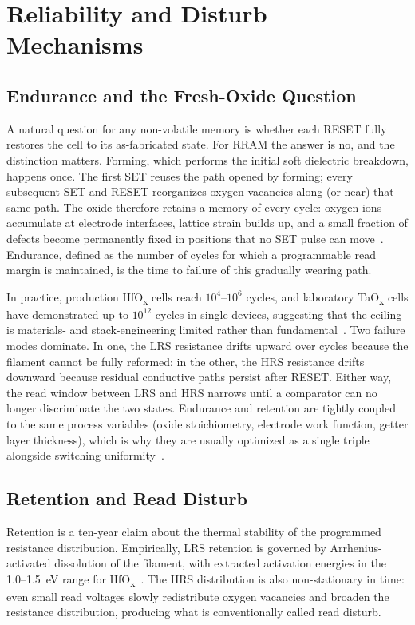 \documentclass[lettersize,journal]{IEEEtran}
\begin{document}
\section{Reliability and Disturb Mechanisms}\label{sec:rel}

\subsection{Endurance and the Fresh-Oxide Question}
A natural question for any non-volatile memory is whether each RESET fully restores the cell to its as-fabricated state. For RRAM the answer is no, and the distinction matters. Forming, which performs the initial soft dielectric breakdown, happens once. The first SET reuses the path opened by forming; every subsequent SET and RESET reorganizes oxygen vacancies along (or near) that same path. The oxide therefore retains a memory of every cycle: oxygen ions accumulate at electrode interfaces, lattice strain builds up, and a small fraction of defects become permanently fixed in positions that no SET pulse can move~\cite{ref_ielmini2016}. Endurance, defined as the number of cycles for which a programmable read margin is maintained, is the time to failure of this gradually wearing path.

In practice, production HfO\textsubscript{x} cells reach $10^4$--$10^6$ cycles, and laboratory TaO\textsubscript{x} cells have demonstrated up to $10^{12}$ cycles in single devices, suggesting that the ceiling is materials- and stack-engineering limited rather than fundamental~\cite{ref_hellenbrand2024,ref_ielmini2016}. Two failure modes dominate. In one, the LRS resistance drifts upward over cycles because the filament cannot be fully reformed; in the other, the HRS resistance drifts downward because residual conductive paths persist after RESET. Either way, the read window between LRS and HRS narrows until a comparator can no longer discriminate the two states. Endurance and retention are tightly coupled to the same process variables (oxide stoichiometry, electrode work function, getter layer thickness), which is why they are usually optimized as a single triple alongside switching uniformity~\cite{ref_niu2016,ref_ielmini2016}.

\subsection{Retention and Read Disturb}
Retention is a ten-year claim about the thermal stability of the programmed resistance distribution. Empirically, LRS retention is governed by Arrhenius-activated dissolution of the filament, with extracted activation energies in the 1.0--1.5~eV range for HfO\textsubscript{x}~\cite{ref_ielmini2016}. The HRS distribution is also non-stationary in time: even small read voltages slowly redistribute oxygen vacancies and broaden the resistance distribution, producing what is conventionally called read disturb.
\end{document}
